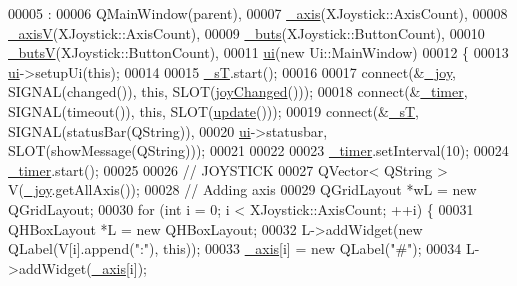 \begin{DoxyCode}
00005                                       :
00006     QMainWindow(parent),
00007     \hyperlink{class_main_window_a30c99d7a544f74b0650758e5cc7ead5a}{\_axis}(XJoystick::AxisCount),
00008     \hyperlink{class_main_window_a20f66f574ed4c96d8dfc0013e1095f15}{\_axisV}(XJoystick::AxisCount),
00009     \hyperlink{class_main_window_a8eaf474e1b8672f32873ed009e28ce8a}{\_buts}(XJoystick::ButtonCount),
00010     \hyperlink{class_main_window_a519ae4630572cb63fbd04bce12fe8e77}{\_butsV}(XJoystick::ButtonCount),
00011     \hyperlink{class_main_window_a35466a70ed47252a0191168126a352a5}{ui}(\textcolor{keyword}{new} Ui::MainWindow)
00012 \{
00013     \hyperlink{class_main_window_a35466a70ed47252a0191168126a352a5}{ui}->setupUi(\textcolor{keyword}{this});
00014     
00015     \hyperlink{class_main_window_a97f8ecc7ecb930b796178cef7b975013}{\_sT}.start();
00016     
00017     connect(&\hyperlink{class_main_window_a671f35800890e518713e1946671d8730}{\_joy}, SIGNAL(changed()), \textcolor{keyword}{this}, SLOT(\hyperlink{class_main_window_abb4c2d8a79c9f80010ea031366bf8226}{joyChanged}()));
00018     connect(&\hyperlink{class_main_window_a254b03b878cfda75c1c411a2f8568d33}{\_timer}, SIGNAL(timeout()), \textcolor{keyword}{this}, SLOT(\hyperlink{class_main_window_a128f71880d4b9683149023fc46fcc9f8}{update}()));
00019     connect(&\hyperlink{class_main_window_a97f8ecc7ecb930b796178cef7b975013}{\_sT}, SIGNAL(statusBar(QString)), 
00020             \hyperlink{class_main_window_a35466a70ed47252a0191168126a352a5}{ui}->statusbar, SLOT(showMessage(QString)));
00021     
00022     
00023     \hyperlink{class_main_window_a254b03b878cfda75c1c411a2f8568d33}{\_timer}.setInterval(10);
00024     \hyperlink{class_main_window_a254b03b878cfda75c1c411a2f8568d33}{\_timer}.start();
00025     
00026     \textcolor{comment}{// JOYSTICK}
00027     QVector< QString > V(\hyperlink{class_main_window_a671f35800890e518713e1946671d8730}{\_joy}.getAllAxis());
00028     \textcolor{comment}{// Adding axis}
00029     QGridLayout *wL = \textcolor{keyword}{new} QGridLayout;
00030     \textcolor{keywordflow}{for} (\textcolor{keywordtype}{int} i = 0; i < XJoystick::AxisCount; ++i) \{
00031         QHBoxLayout *L = \textcolor{keyword}{new} QHBoxLayout;
00032         L->addWidget(\textcolor{keyword}{new} QLabel(V[i].append(\textcolor{stringliteral}{":"}), \textcolor{keyword}{this}));
00033         \hyperlink{class_main_window_a30c99d7a544f74b0650758e5cc7ead5a}{\_axis}[i] = \textcolor{keyword}{new} QLabel(\textcolor{stringliteral}{"#"});
00034         L->addWidget(\hyperlink{class_main_window_a30c99d7a544f74b0650758e5cc7ead5a}{\_axis}[i]);

\end{DoxyCode}
